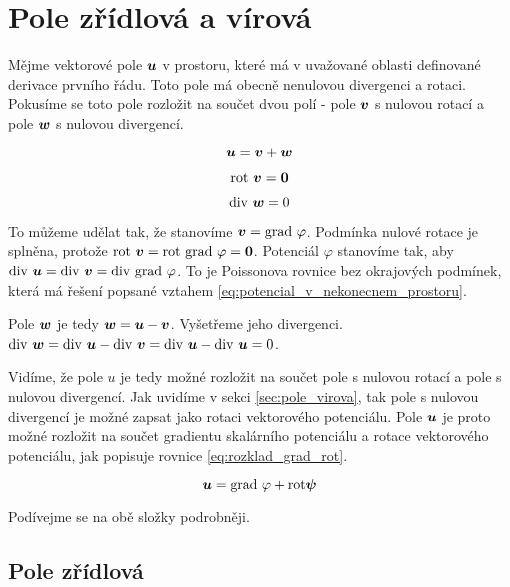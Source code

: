 \section{Pole zřídlová a vírová}

Mějme vektorové pole \(\boldsymbol{u}\) v prostoru, které má v uvažované oblasti definované derivace prvního řádu. Toto pole má obecně nenulovou divergenci a rotaci.
Pokusíme se toto pole rozložit na součet dvou polí - pole \(\boldsymbol{v}\) s nulovou rotací a pole \(\boldsymbol{w}\) s nulovou divergencí.

\begin{equation}
\boldsymbol{u} = \boldsymbol{v} + \boldsymbol{w}
\end{equation}

\begin{equation}
\mathrm{rot} \ \boldsymbol{v} = \boldsymbol{0}
\end{equation}

\begin{equation}
\mathrm{div} \ \boldsymbol{w} = 0
\end{equation}

To můžeme udělat tak, že stanovíme \(\boldsymbol{v} = \mathrm{grad} \ \varphi\). Podmínka nulové rotace je splněna, protože \(\mathrm{rot} \ \boldsymbol{v} = \mathrm{rot} \ \mathrm{grad} \ \varphi = \boldsymbol{0}\).
Potenciál \(\varphi\) stanovíme tak, aby \(\mathrm{div} \ \boldsymbol{u} = \mathrm{div} \ \boldsymbol{v} = \mathrm{div} \ \mathrm{grad} \ \varphi\). To je Poissonova rovnice bez okrajových podmínek, která má řešení popsané vztahem \eqref{eq:potencial_v_nekonecnem_prostoru}.

Pole \(\boldsymbol{w}\) je tedy \(\boldsymbol{w} = \boldsymbol{u} - \boldsymbol{v}\). Vyšetřeme jeho divergenci. \(\diverg \ \vect{w} = \diverg \ \vect{u} - \diverg \ \vect{v} = \diverg \ \vect{u} - \diverg \ \vect{u} = 0\).

Vidíme, že pole \(u\) je tedy možné rozložit na součet pole s nulovou rotací a pole s nulovou divergencí. Jak uvidíme v sekci \ref{sec:pole_virova}, tak pole
s nulovou divergencí je možné zapsat jako rotaci vektorového potenciálu. Pole \(\boldsymbol{u}\) je proto možné rozložit na součet gradientu skalárního potenciálu
a rotace vektorového potenciálu, jak popisuje rovnice \eqref{eq:rozklad_grad_rot}.

\begin{equation}
\label{eq:rozklad_grad_rot}
\boldsymbol{u} = \mathrm{grad} \ \varphi + \mathrm{rot} \boldsymbol{\psi}
\end{equation}

Podívejme se na obě složky podrobněji.

\subsection{Pole zřídlová}

